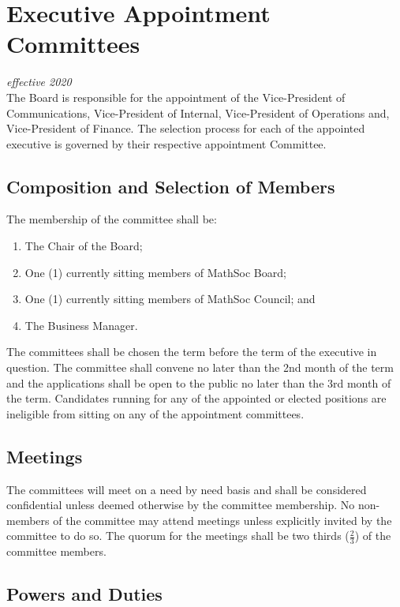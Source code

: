 \section{Executive Appointment Committees}
\emph{effective 2020}\\

The Board is responsible for the appointment of the Vice-President of Communications, Vice-President of Internal, Vice-President of Operations and, Vice-President of Finance.  
The selection process for each of the appointed executive is governed by their respective appointment Committee. 

\subsection{Composition and Selection of Members}
The membership of the committee shall be:
\begin{enumerate}
    \item The Chair of the Board;
    \item One (1) currently sitting members of MathSoc Board;
    \item One (1) currently sitting members of MathSoc Council; and
    \item The Business Manager.
\end{enumerate}

The committees shall be chosen the term before the term of the executive in question. 
The committee shall convene no later than the 2nd month of the term and the applications shall be open to the public no later than the 3rd month of the term.
Candidates running for any of the appointed or elected positions are ineligible from sitting on any of the appointment committees. 

\subsection{Meetings}
The committees will meet on a need by need basis and shall be considered confidential unless deemed otherwise by the committee membership. 
No non-members of the committee may attend meetings unless explicitly invited by the committee to do so.
The quorum for the meetings shall be two thirds ($\frac{2}{3}$) of the committee members.

\subsection{Powers and Duties}

